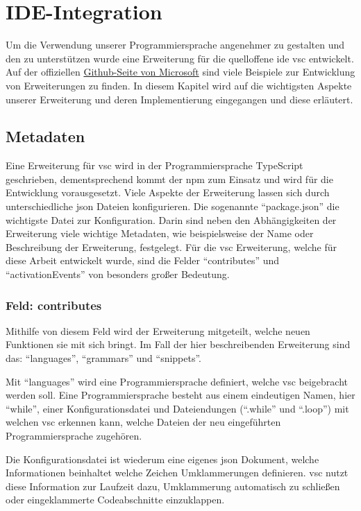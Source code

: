 \chapter{IDE-Integration}
Um die Verwendung unserer Programmiersprache angenehmer zu gestalten und den zu unterstützen wurde eine Erweiterung für die quelloffene \acs{ide} \ac{vsc} entwickelt.
Auf der offiziellen \href{https://github.com/microsoft/vscode-extension-samples}{Github-Seite von Microsoft} sind viele Beispiele zur Entwicklung von Erweiterungen zu finden. \cite{MicrosoftCorporation2022}
In diesem Kapitel wird auf die wichtigsten Aspekte unserer Erweiterung und deren Implementierung eingegangen und diese erläutert. 


\section{Metadaten}
Eine Erweiterung für \ac{vsc} wird in der Programmiersprache TypeScript geschrieben, dementsprechend kommt der \ac{npm} zum Einsatz und wird für die Entwicklung vorausgesetzt.
Viele Aspekte der Erweiterung lassen sich durch unterschiedliche \ac{json} Dateien konfigurieren. 
Die sogenannte \enquote{package.json} die wichtigste Datei zur Konfiguration.
Darin sind neben den Abhängigkeiten der Erweiterung viele wichtige Metadaten, wie beispielsweise der Name oder Beschreibung der Erweiterung, festgelegt.
Für die \ac{vsc} Erweiterung, welche für diese Arbeit entwickelt wurde, sind die Felder \enquote{contributes} und \enquote{activationEvents} von besonders großer Bedeutung. 

\subsection{Feld: contributes}
Mithilfe von diesem Feld wird der Erweiterung mitgeteilt, welche neuen Funktionen sie mit sich bringt.
Im Fall der hier beschreibenden Erweiterung sind das: \enquote{languages}, \enquote{grammars} und \enquote{snippets}. 

Mit \enquote{languages} wird eine Programmiersprache definiert, welche \ac{vsc} beigebracht werden soll.
Eine Programmiersprache besteht aus einem eindeutigen Namen, hier \enquote{while}, einer Konfigurationsdatei und Dateiendungen (\enquote{.while} und \enquote{.loop}) mit welchen \ac{vsc} erkennen kann, welche Dateien der neu eingeführten Programmiersprache zugehören.

Die Konfigurationsdatei ist wiederum eine eigenes \ac{json} Dokument, welche Informationen beinhaltet welche Zeichen Umklammerungen definieren. \ac{vsc} nutzt diese Information zur Laufzeit dazu, Umklammerung automatisch zu schließen oder eingeklammerte Codeabschnitte einzuklappen.

